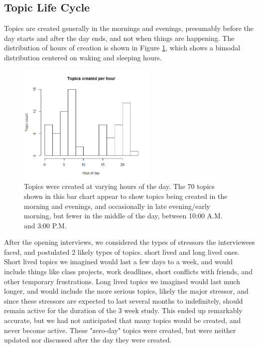     \subsection{Topic Life Cycle}
    Topics are created generally in the mornings and evenings,
    presumably before the day starts and after the day ends,
    and not when things are happening.
    The distribution of hours of creation is shown in
    Figure \ref{fig:topic_hours},
    which shows a bimodal distribution centered on waking and sleeping hours.

    \begin{figure}
    \centering
    \includegraphics[width=0.6\textwidth]{topics_per_hour.jpg}
    \caption[Topics Created by Hour of Day]{
      Topics were created at varying hours of the day.
      The 70 topics shown in this bar chart appear to show
      topics being created in the morning and evenings,
      and occasionally in late evening/early morning,
      but fewer in the middle of the day, between 10:00 A.M. and 3:00 P.M.
    }
    \label{fig:topic_hours}
    \end{figure}

    After the opening interviews, we considered the types of stressors the
    interviewees faced, and postulated 2 likely types of topics.
    short lived and long lived ones.
    Short lived topics we imagined would last a few days to a week,
    and would include things like class projects,
    work deadlines, short conflicts with friends, and other temporary frustrations.
    Long lived topics we imagined would last much longer,
    and would include the more serious topics, likely the major stressor,
    and since these stressors are expected to last several months to indefinitely,
    should remain active for the duration of the 3 week study.
    This ended up remarkably accurate,
    but we had not anticipated that many topics would be created,
    and never become active.
    These "zero-day" topics were created,
    but were neither updated nor discussed after the day they were created.

